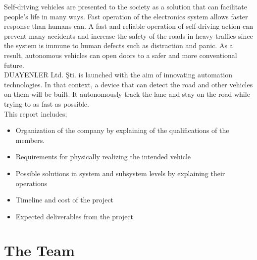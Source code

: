 \documentclass[a4paper,12pt]{article}
\begin{document}
Self-driving vehicles are presented to the society as a solution that can facilitate people's life in many ways. Fast operation of the electronics system allows faster response than humans can. A fast and reliable operation of self-driving action can prevent many accidents and increase the safety of the roads in heavy traffics since the system is immune to human defects such as distraction and panic. As a result, autonomous vehicles can open doors to a safer and more conventional future.\\

DUAYENLER Ltd. Şti. is launched with the aim of innovating automation technologies. In that context, a device that can detect the road and other vehicles on them will be built. It autonomously track the lane and stay on the road while trying to as fast as possible.\\

This report includes;
\begin{itemize}
	\item Organization of the company by explaining of the qualifications of the members. 
	\item Requirements for physically realizing the intended vehicle
	\item Possible solutions in system and subsystem levels by explaining their operations
	\item Timeline and cost of the project
	\item Expected deliverables from the project 
\end{itemize} 



\section{The Team}
\end{document}
